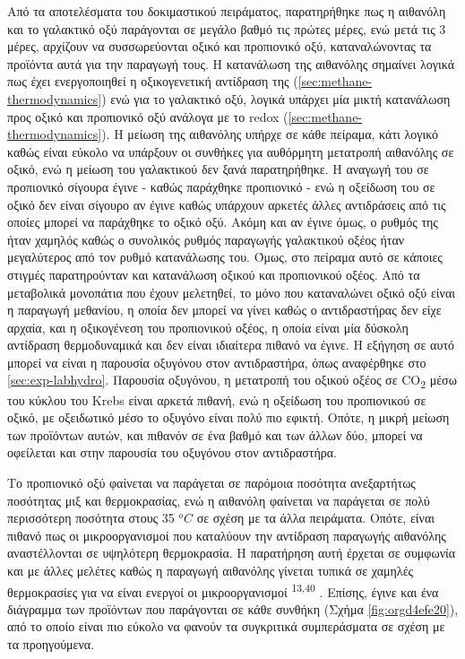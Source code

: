 \documentclass[11pt]{report}
\makeatletter
\newcommand{\citeprocitem}[2]{\hyper@linkstart{cite}{citeproc_bib_item_#1}#2\hyper@linkend}
\makeatother
\begin{document}
Από τα αποτελέσματα του δοκιμαστικού πειράματος, παρατηρήθηκε πως η αιθανόλη και το γαλακτικό οξύ παράγονται σε μεγάλο βαθμό τις πρώτες μέρες, ενώ μετά τις 3 μέρες, αρχίζουν να συσσωρεύονται οξικό και προπιονικό οξύ, καταναλώνοντας τα προϊόντα αυτά για την παραγωγή τους. Η κατανάλωση της αιθανόλης σημαίνει λογικά πως έχει ενεργοποιηθεί η οξικογενετική αντίδραση της (\autoref{sec:methane-thermodynamics}) ενώ για το γαλακτικό οξύ, λογικά υπάρχει μία μικτή κατανάλωση προς οξικό και προπιονικό οξύ ανάλογα με το \acrshort{redox} (\autoref{sec:methane-thermodynamics}). Η μείωση της αιθανόλης υπήρχε σε κάθε πείραμα, κάτι λογικό καθώς είναι εύκολο να υπάρξουν οι συνθήκες για αυθόρμητη μετατροπή αιθανόλης σε οξικό, ενώ η μείωση του γαλακτικού δεν ξανά παρατηρήθηκε. Η αναγωγή του σε προπιονικό σίγουρα έγινε - καθώς παράχθηκε προπιονικό - ενώ η οξείδωση του σε οξικό δεν είναι σίγουρο αν έγινε καθώς υπάρχουν αρκετές άλλες αντιδράσεις από τις οποίες μπορεί να παράχθηκε το οξικό οξύ. Ακόμη και αν έγινε όμως, ο ρυθμός της ήταν χαμηλός καθώς ο συνολικός ρυθμός παραγωγής γαλακτικού οξέος ήταν μεγαλύτερος από τον ρυθμό κατανάλωσης του. Όμως, στο πείραμα αυτό σε κάποιες στιγμές παρατηρούνταν και κατανάλωση οξικού και προπιονικού οξέος. Από τα μεταβολικά μονοπάτια που έχουν μελετηθεί, το μόνο που καταναλώνει οξικό οξύ είναι η παραγωγή μεθανίου, η οποία δεν μπορεί να γίνει καθώς ο αντιδραστήρας δεν είχε αρχαία, και η οξικογένεση του προπιονικού οξέος, η οποία είναι μία δύσκολη αντίδραση θερμοδυναμικά και δεν είναι ιδιαίτερα πιθανό να έγινε. Η εξήγηση σε αυτό μπορεί να είναι η παρουσία οξυγόνου στον αντιδραστήρα, όπως αναφέρθηκε στο \autoref{sec:exp-labhydro}. Παρουσία οξυγόνου, η μετατροπή του οξικού οξέος σε CO\textsubscript{2} μέσω του κύκλου του Krebs είναι αρκετά πιθανή, ενώ η οξείδωση του προπιονικού σε οξικό, με οξειδωτικό μέσο το οξυγόνο είναι πολύ πιο εφικτή. Οπότε, η μικρή μείωση των προϊόντων αυτών, και πιθανόν σε ένα βαθμό και των άλλων δύο, μπορεί να οφείλεται και στην παρουσία του οξυγόνου στον αντιδραστήρα.

Το προπιονικό οξύ φαίνεται να παράγεται σε παρόμοια ποσότητα ανεξαρτήτως ποσότητας μιξ και θερμοκρασίας, ενώ η αιθανόλη φαίνεται να παράγεται σε πολύ περισσότερη ποσότητα στους 35 \(^oC\) σε σχέση με τα άλλα πειράματα. Οπότε, είναι πιθανό πως οι μικροοργανισμοί που καταλύουν την αντίδραση παραγωγής αιθανόλης αναστέλλονται σε υψηλότερη θερμοκρασία. Η παρατήρηση αυτή έρχεται σε συμφωνία και με άλλες μελέτες καθώς η παραγωγή αιθανόλης γίνεται τυπικά σε χαμηλές θερμοκρασίες για να είναι ενεργοί οι μικροοργανισμοί \textsuperscript{\citeprocitem{13}{13},\citeprocitem{40}{40}} . Επίσης, έγινε και ένα διάγραμμα των προϊόντων που παράγονται σε κάθε συνθήκη (Σχήμα \ref{fig:orgd4efe20}), από το οποίο είναι πιο εύκολο να φανούν τα συγκριτικά συμπεράσματα σε σχέση με τα προηγούμενα.
\end{document}
